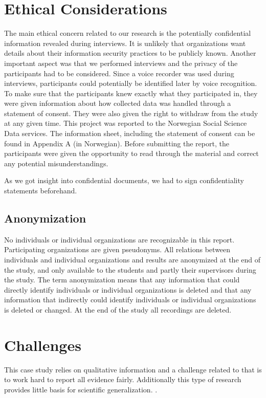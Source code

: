 \section{Ethical Considerations}
\label{sec:ethical}
The main ethical concern related to our research is the potentially confidential information revealed during interviews. It is unlikely that organizations want details about their information security practices to be publicly known. Another important aspect was that we performed interviews and the privacy of the participants had to be considered. Since a voice recorder was used during interviews, participants could potentially be identified later by voice recognition. To make sure that the participants knew exactly what they participated in, they were given information about how collected data was handled through a statement of consent. They were also given the right to withdraw from the study at any given time. This project was reported to the Norwegian Social Science Data services. The information sheet, including the statement of consent can be found in Appendix A (in Norwegian). Before submitting the report, the participants were given the opportunity to read through the material and correct any potential misunderstandings.   

As we got insight into confidential documents, we had to sign confidentiality statements beforehand.


\subsection{Anonymization}
No individuals or individual organizations are recognizable in this report. Participating organizations are given pseudonyms. All relations between individuals and individual organizations and results are anonymized at the end of the study, and only available to the students and partly their supervisors during the study. The term anonymization means that any information that could directly identify individuals or individual organizations is deleted and that any information that indirectly could identify individuals or individual organizations is deleted or changed. At the end of the study all recordings are deleted.

\section{Challenges}
This case study relies on qualitative information and a challenge related to that is to work hard to report all evidence fairly. Additionally this type of research provides little basis for scientific generalization. \cite{CaseStudyResearch}.

